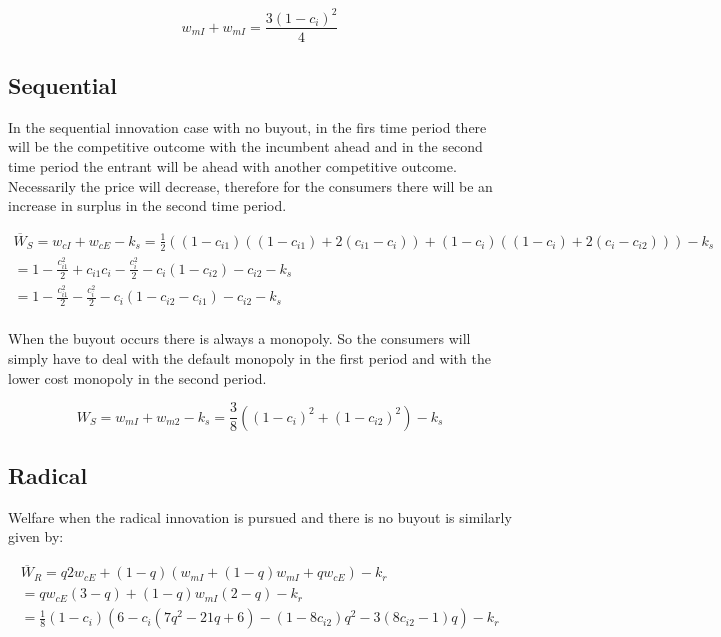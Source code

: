 \documentclass[11pt]{article}
\begin{document}
\begin{equation*}
w_{mI}+w_{mI} = \frac{3(1-c_i)^2}{4}
\end{equation*}

\subsection{Sequential}

In the sequential innovation case with no buyout, in the firs time period there will be the competitive outcome with the incumbent ahead and in the second time period the entrant will be ahead with another competitive outcome. Necessarily the price will decrease, therefore for the consumers there will be an increase in surplus in the second time period. 

\begin{align*}
\overline{W}_{S} = w_{cI}
+
w_{cE}-k_s
=
\frac{1}{2}
\left(
(1-c_{i1})
\left(
(1-c_{i1})+2(c_{i1}-c_i )
\right)
+
(1-c_{i})
\left(
(1-c_{i})+2(c_{i}-c_{i2} )
\right) 
\right)
-k_s
\\
=1-\frac{c_{i1}^2}{2}+c_{i1} c_{i}-\frac{c_{i}^2}{2}-c_{i} (1-c_{i2})-c_{i2}
-k_s \\
=1-\frac{c_{i1}^2}{2}-\frac{c_{i}^2}{2}-c_{i} (1-c_{i2}-c_{i1})-c_{i2}
-k_s
\\
\end{align*}

When the buyout occurs there is always a monopoly. So the consumers will simply have to deal with the default monopoly in the first period and with the lower cost monopoly in the second period. 

\begin{equation}
W_S = w_{mI} +  w_{m2}-k_s = \frac{3}{8}
\left(
(1-c_i)^2+(1-c_{i2})^2
\right)-k_s
\end{equation}


\subsection{Radical}

Welfare when the radical innovation is pursued and there is no buyout is similarly given by: 

\begin{align*}
\overline{W}_R = q2w_{cE}
+(1-q)(w_{mI}+(1-q)w_{mI}+qw_{cE})- k_r \\
= q w_{cE}(3-q ) 
+(1-q)w_{mI}(2-q) -k_r \\
=\frac{1}{8} (1-c_{i}) \left(6-c_{i} \left(7 q^2-21 q+6\right)-(1-8 c_{i2}) q^2-3 (8 c_{i2}-1) q\right)-k_r
\end{align*}
\end{document}
